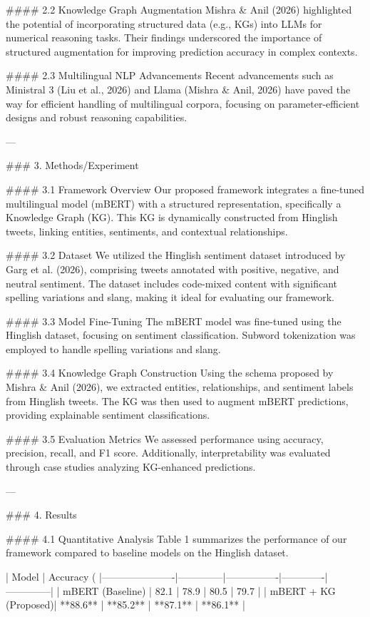 #### 2.2 Knowledge Graph Augmentation  
Mishra & Anil (2026) highlighted the potential of incorporating structured data (e.g., KGs) into LLMs for numerical reasoning tasks. Their findings underscored the importance of structured augmentation for improving prediction accuracy in complex contexts.  

#### 2.3 Multilingual NLP Advancements  
Recent advancements such as Ministral 3 (Liu et al., 2026) and Llama (Mishra & Anil, 2026) have paved the way for efficient handling of multilingual corpora, focusing on parameter-efficient designs and robust reasoning capabilities.  

---

### 3. Methods/Experiment  

#### 3.1 Framework Overview  
Our proposed framework integrates a fine-tuned multilingual model (mBERT) with a structured representation, specifically a Knowledge Graph (KG). This KG is dynamically constructed from Hinglish tweets, linking entities, sentiments, and contextual relationships.  

#### 3.2 Dataset  
We utilized the Hinglish sentiment dataset introduced by Garg et al. (2026), comprising tweets annotated with positive, negative, and neutral sentiment. The dataset includes code-mixed content with significant spelling variations and slang, making it ideal for evaluating our framework.  

#### 3.3 Model Fine-Tuning  
The mBERT model was fine-tuned using the Hinglish dataset, focusing on sentiment classification. Subword tokenization was employed to handle spelling variations and slang.  

#### 3.4 Knowledge Graph Construction  
Using the schema proposed by Mishra & Anil (2026), we extracted entities, relationships, and sentiment labels from Hinglish tweets. The KG was then used to augment mBERT predictions, providing explainable sentiment classifications.  

#### 3.5 Evaluation Metrics  
We assessed performance using accuracy, precision, recall, and F1 score. Additionally, interpretability was evaluated through case studies analyzing KG-enhanced predictions.

---

### 4. Results  

#### 4.1 Quantitative Analysis  
Table 1 summarizes the performance of our framework compared to baseline models on the Hinglish dataset.

| Model                | Accuracy (%
|----------------------|--------------|----------------|-------------|--------------|
| mBERT (Baseline)     | 82.1         | 78.9           | 80.5        | 79.7         |
| mBERT + KG (Proposed)| **88.6**     | **85.2**       | **87.1**    | **86.1**     |

